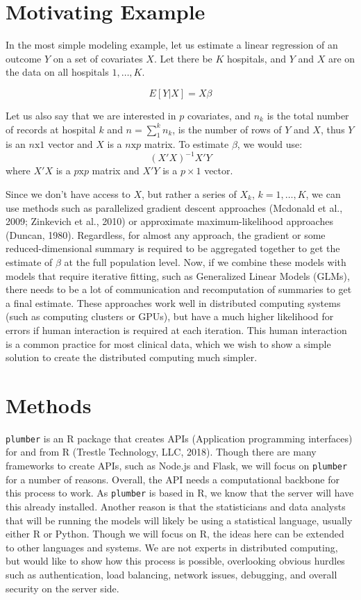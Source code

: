 \documentclass[]{elsarticle} %
\begin{document}
\hypertarget{motivating-example}{%
\section{Motivating Example}\label{motivating-example}}

In the most simple modeling example, let us estimate a linear regression
of an outcome \(Y\) on a set of covariates \(X\). Let there be \(K\)
hospitals, and \(Y\) and \(X\) are on the data on all hospitals
\(1, \dots, K\).

\[
E[Y | X] = X\beta
\]

Let us also say that we are interested in \(p\) covariates, and
\(n_{k}\) is the total number of records at hospital \(k\) and
\(n = \sum_{1}^{k} n_{k}\), is the number of rows of \(Y\) and \(X\),
thus \(Y\) is an \(n\text{x}1\) vector and \(X\) is a \(n\text{x}p\)
matrix. To estimate \(\beta\), we would use: \[
(X'X)^{-1} X'Y
\] where \(X'X\) is a \(p\text{x}p\) matrix and \(X'Y\) is a
\(p\times{1}\) vector.

Since we don't have access to \(X\), but rather a series of \(X_{k}\),
\(k = 1, \dots, K\), we can use methods such as parallelized gradient
descent approaches (Mcdonald et al., 2009; Zinkevich et al., 2010) or
approximate maximum-likelihood approaches (Duncan, 1980). Regardless,
for almost any approach, the gradient or some reduced-dimensional
summary is required to be aggregated together to get the estimate of
\(\beta\) at the full population level. Now, if we combine these models
with models that require iterative fitting, such as Generalized Linear
Models (GLMs), there needs to be a lot of communication and
recomputation of summaries to get a final estimate. These approaches
work well in distributed computing systems (such as computing clusters
or GPUs), but have a much higher likelihood for errors if human
interaction is required at each iteration. This human interaction is a
common practice for most clinical data, which we wish to show a simple
solution to create the distributed computing much simpler.

\hypertarget{methods}{%
\section{Methods}\label{methods}}

\texttt{plumber} is an R package that creates APIs (Application
programming interfaces) for and from R (Trestle Technology, LLC, 2018).
Though there are many frameworks to create APIs, such as Node.js and
Flask, we will focus on \texttt{plumber} for a number of reasons.
Overall, the API needs a computational backbone for this process to
work. As \texttt{plumber} is based in R, we know that the server will
have this already installed. Another reason is that the statisticians
and data analysts that will be running the models will likely be using a
statistical language, usually either R or Python. Though we will focus
on R, the ideas here can be extended to other languages and systems. We
are not experts in distributed computing, but would like to show how
this process is possible, overlooking obvious hurdles such as
authentication, load balancing, network issues, debugging, and overall
security on the server side.
\end{document}

